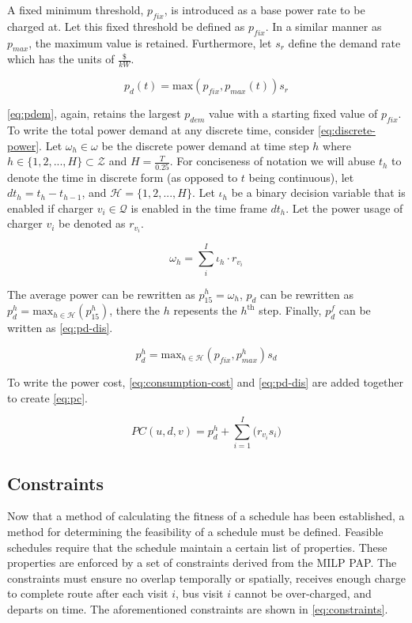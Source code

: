 \documentclass[ee,msthesis]{usuthesis}
\newcommand{\PC}{PC(u, d, v)}               %
\newcommand{\Qset}{\mathcal{Q}}             %
\newcommand{\Hset}{\mathcal{H}}             %
\begin{document}
A fixed minimum threshold, \(p_{fix}\), is introduced as a base power rate to be charged at. Let this fixed threshold be
defined as \(p_{fix}\). In a similar manner as \(p_{max}\), the maximum value is retained. Furthermore, let \(s_r\) define the
demand rate which has the units of \(\frac{\$}{kW}\).

\begin{equation}
\label{eq:pdem}
p_d(t) = \text{max}(p_{fix},p_{max}(t))s_r
\end{equation}

\ref{eq:pdem}, again, retains the largest \(p_{dem}\) value with a starting fixed value of \(p_{fix}\). To write the total power
demand at any discrete time, consider \ref{eq:discrete-power}. Let \(\omega_h \in \omega\) be the discrete power demand at time step \(h\)
where \(h \in \{ 1, 2, ..., H \} \subset \mathcal{Z}\) and \(H = \frac{T}{0.25}\). For conciseness of notation we will abuse \(t_h\) to denote
the time in discrete form (as opposed to \(t\) being continuous), let \(dt_h = t_h - t_{h-1}\), and \(\Hset = \{ 1, 2, ..., H
\}\). Let \(\iota_h\) be a binary decision variable that is enabled if charger \(v_i \in \Qset\) is enabled in the time frame
\(dt_h\). Let the power usage of charger \(v_i\) be denoted as \(r_{v_i}\).

\begin{equation}
\label{eq:discrete-power}
  \omega_h = \sum_i^I \iota_h \cdot r_{v_i}
\end{equation}

The average power can be rewritten as \(p_{15}^h = \omega_h\), \(p_d\) can be rewritten as \(p_d^h = \text{max}_{h \in \Hset}
(p_{15}^{h})\), there the \(h\) repesents the \(h^{\text{th}}\) step. Finally, \(p_d^f\) can be written as \ref{eq:pd-dis}.

\begin{equation}
\label{eq:pd-dis}
  p_d^h = \text{max}_{h \in \Hset}(p_{fix}, p_{max}^h)s_d
\end{equation}

To write the power cost, \ref{eq:consumption-cost} and \ref{eq:pd-dis} are added together to create \ref{eq:pc}.

\begin{equation}
\label{eq:pc}
\PC = p^h_d + \sum_{i=1}^I \Big( r_{v_i}s_i \Big)
\end{equation}

\subsection{Constraints}
\label{sec:constraints}
Now that a method of calculating the fitness of a schedule has been established, a method for determining the
feasibility of a schedule must be defined. Feasible schedules require that the schedule maintain a certain list of
properties. These properties are enforced by a set of constraints derived from the MILP PAP. The constraints must ensure
no overlap temporally or spatially, receives enough charge to complete route after each visit \(i\), bus visit \(i\) cannot
be over-charged, and departs on time. The aforementioned constraints are shown in \ref{eq:constraints}.
\end{document}
